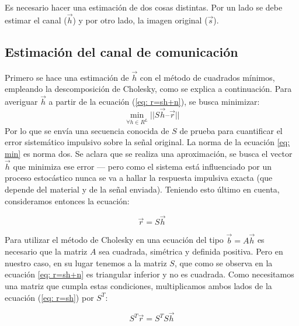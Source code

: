 Es necesario hacer una estimaci\'on de dos cosas distintas. Por un lado se debe estimar el canal ($\vec{h}$) y por otro lado, la imagen original  ($\vec{s}$).

\subsection{Estimaci\'on del canal de comunicaci\'on}

Primero se hace una estimaci\'on de $\vec{h}$ con el m\'etodo de cuadrados m\'inimos, empleando la descomposici\'on de Cholesky, como se explica a continuaci\'on.  Para averiguar $\vec{h}$ a partir de la ecuaci\'on (\ref{eq: r=sh+n}), se busca minimizar:
\begin{equation}
\min_{\forall h \in R^L}  || S \vec{h} – \vec{r}  ||
\label{eq: min}
\end{equation}
Por lo que se env\'ia una secuencia conocida de $S$ de prueba para cuantificar el error sistem\'atico impulsivo sobre la se\~nal original. La norma de la ecuaci\'on \ref{eq: min} es norma dos. Se aclara que se realiza una aproximaci\'on, se busca el vector $\vec{h}$ que minimiza ese error — pero como el sistema est\'a influenciado por un proceso estoc\'astico nunca se va a hallar la respuesta impulsiva exacta (que depende del material y de la se\~nal enviada).
Teniendo esto \'ultimo en cuenta, consideramos entonces la ecuaci\'on:



\begin{equation} 
\vec{r} = S \vec{h}
\label{eq: r=sh} 
\end{equation} 

Para utilizar el m\'etodo de Cholesky en una ecuaci\'on del tipo $\vec{b} = A \vec{h}$ es necesario que la matriz $A$ sea cuadrada, sim\'etrica y definida positiva. Pero en nuestro caso,  en su lugar tenemos a la matriz $S$, que como se observa en la ecuación \ref{eq: r=sh+n} es triangular inferior y no es cuadrada. Como necesitamos una matriz que cumpla estas condiciones, multiplicamos ambos lados de la ecuaci\'on (\ref{eq: r=sh}) por $S^T$:

\begin{equation} 
S^T \vec{r} = S^T S \vec{h} 
\end{equation} 

